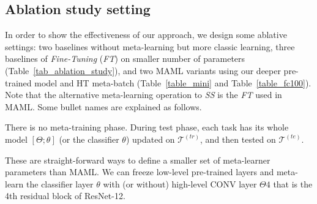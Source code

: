 


\subsection{Ablation study setting}
\label{sec_setting}

In order to show the effectiveness of our approach, we design some ablative settings: 
%
two baselines without meta-learning but more classic learning,
three baselines of \emph{Fine-Tuning} (\emph{FT}) on smaller number of parameters (Table~\ref{tab_ablation_study}), and
%
two MAML variants using our deeper pre-trained model and HT meta-batch (Table~\ref{table_mini} and Table~\ref{table_fc100}).
Note that the alternative meta-learning operation to \emph{SS} is the \emph{FT} used in MAML.
Some bullet names are explained as follows.

There is no meta-training phase. During test phase, each task has its whole model $[\Theta; \theta]$ (or the classifier $\theta$) updated on $\mathcal{T}^{(tr)}$, and then tested on $\mathcal{T}^{(te)}$.

These are straight-forward ways to define a smaller set of meta-learner parameters than MAML.
We can freeze low-level pre-trained layers and meta-learn the classifier layer $\theta$ with (or without) high-level CONV layer $\Theta 4$ that is the 4th residual block of ResNet-12.
